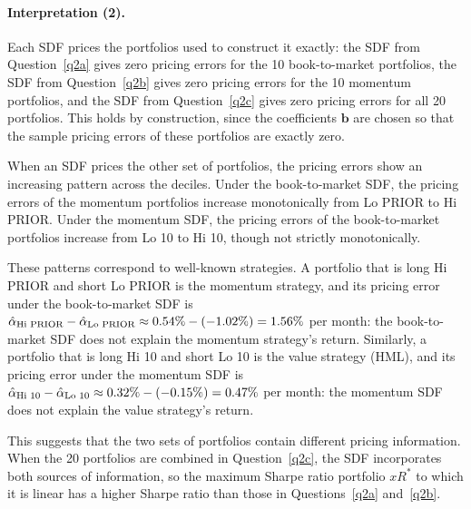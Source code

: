 \documentclass[11pt]{article}
\begin{document}
\paragraph{Interpretation (2).}
Each SDF prices the portfolios used to construct it exactly: the SDF from Question~\ref{q2a} gives zero
pricing errors for the 10 book-to-market portfolios, the SDF from Question~\ref{q2b} gives zero pricing
errors for the 10 momentum portfolios, and the SDF from Question~\ref{q2c} gives zero pricing errors for all
20 portfolios. This holds by construction, since the coefficients $\mathbf{b}$ are chosen so that the sample
pricing errors of these portfolios are exactly zero.

When an SDF prices the other set of portfolios, the pricing errors show an increasing pattern across the
deciles. Under the book-to-market SDF, the pricing errors of the momentum portfolios increase monotonically
from Lo PRIOR to Hi PRIOR. Under the momentum SDF, the pricing errors of the book-to-market portfolios
increase from Lo 10 to Hi 10, though not strictly monotonically.

These patterns correspond to well-known strategies. A portfolio that is long Hi PRIOR and short Lo PRIOR is
the momentum strategy, and its pricing error under the book-to-market SDF is
$\hat{\alpha}_{\text{Hi PRIOR}} - \hat{\alpha}_{\text{Lo PRIOR}} \approx 0.54\% - (-1.02\%)
= 1.56\%$ per month: the book-to-market SDF does not explain the momentum strategy's return.
Similarly, a portfolio that is long Hi 10 and short Lo 10 is the value strategy (HML), and its pricing error
under the momentum SDF is
$\hat{\alpha}_{\text{Hi 10}} - \hat{\alpha}_{\text{Lo 10}} \approx 0.32\% - (-0.15\%)
= 0.47\%$ per month: the momentum SDF does not explain the value strategy's return.

This suggests that the two sets of portfolios contain different pricing information. When the 20 portfolios
are combined in Question~\ref{q2c}, the SDF incorporates both sources of information, so the maximum Sharpe
ratio portfolio $xR^*$ to which it is linear has a higher Sharpe ratio than those in Questions~\ref{q2a}
and~\ref{q2b}.

\FloatBarrier
\end{document}
